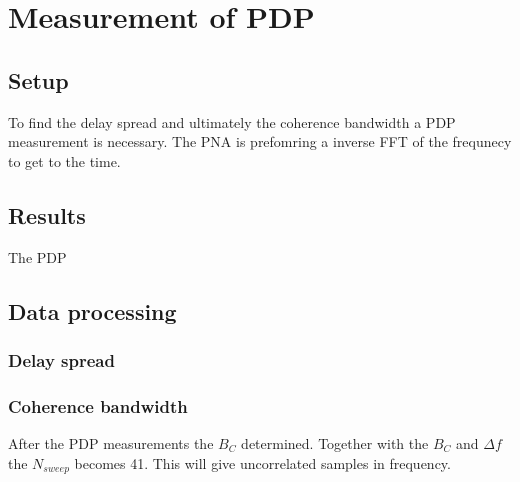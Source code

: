 \chapter{Measurement of PDP}
\section{Setup}
To find the delay spread and ultimately the coherence bandwidth a \gls{PDP} measurement is necessary. The PNA is prefomring a inverse FFT of the frequnecy to get to the time.
\section{Results}
The PDP 
\section{Data processing}
\subsection{Delay spread}

\subsection{Coherence bandwidth}\label{sec:coherence_bandwidth}
After the PDP measurements the $B_C$ determined. Together with the $B_C$ and $\Delta f$ the $N_{sweep}$ becomes 41. This will give uncorrelated samples in frequency.
